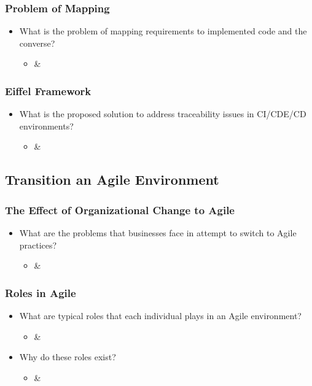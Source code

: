 \documentclass[12pt,a4paper]{article}
\begin{document}
		\subsubsection{Problem of Mapping}
		\begin{itemize}[noitemsep]
			\item What is the problem of mapping requirements to implemented code and the converse?
			\begin{itemize}
				\item \cite{stahl_2017} \& \cite{stahl_hallen_bosch_2016}
			\end{itemize}
		\end{itemize}
		\subsubsection{Eiffel Framework}
		\begin{itemize}[noitemsep]
			\item What is the proposed solution to address traceability issues in CI/CDE/CD environments?
			\begin{itemize}
				\item \cite{stahl_2017} \& \cite{stahl_hallen_bosch_2016}
			\end{itemize}
		\end{itemize}
		
	\subsection{Transition an Agile Environment}
		\subsubsection{The Effect of Organizational Change to Agile}
		\begin{itemize}[noitemsep]
			\item What are the problems that businesses face in attempt to switch to Agile practices?
			\begin{itemize}
				\item \cite{bosch_2014} \& \cite{meyer_2014}
			\end{itemize}
		\end{itemize}
		\subsubsection{Roles in Agile}
		\begin{itemize}[noitemsep]
			\item What are typical roles that each individual plays in an Agile environment?
			\begin{itemize}
				\item \cite{bosch_2014} \& \cite{meyer_2014}
			\end{itemize}
			\item Why do these roles exist?
			\begin{itemize}
				\item \cite{bosch_2014} \& \cite{meyer_2014}
			\end{itemize}
		\end{itemize}
\end{document}
